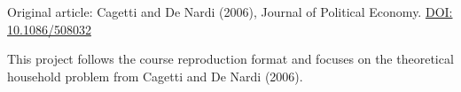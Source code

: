 \documentclass[\latexroot/\projectname]{subfiles}
\begin{document}
\centerline{Original article: Cagetti and De Nardi (2006), Journal of Political Economy. \href{https://doi.org/10.1086/508032}{DOI: 10.1086/508032}}
\vspace{-0.3\baselineskip}

\begin{authorsinfo}
  \noindent {}
\end{authorsinfo}


\whenintegrated{\label{funding-info}}
\vspace{0.3\baselineskip}
\begin{minipage}{\textwidth}
  \footnotesize This project follows the course reproduction format and focuses on the theoretical household problem from Cagetti and De Nardi (2006).
  
\end{minipage}

\titlepagefinish
\smartbib
\end{document}
